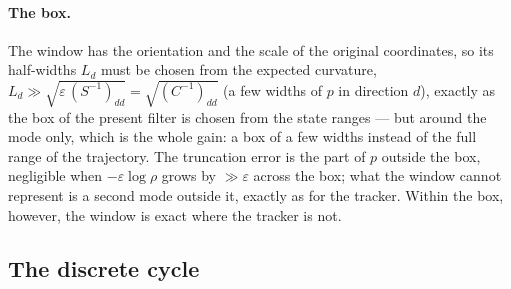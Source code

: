 \documentclass[11pt,a4paper]{article}
\newcommand{\eps}{\varepsilon}
\theoremstyle{plain}
\theoremstyle{definition}
\theoremstyle{remark}
\begin{document}
\paragraph{The box.}
The window has the orientation and the scale of the original coordinates, so its half-widths $L_d$ must be chosen from the expected curvature, $L_d\gg\sqrt{\eps\,(S^{-1})_{dd}} = \sqrt{(C^{-1})_{dd}}$ (a few widths of $p$ in direction $d$), exactly as the box of the present filter is chosen from the state ranges --- but around the mode only, which is the whole gain: a box of a few widths instead of the full range of the trajectory. The truncation error is the part of $p$ outside the box, negligible when $-\eps\log\rho$ grows by $\gg\eps$ across the box; what the window cannot represent is a second mode outside it, exactly as for the tracker. Within the box, however, the window is exact where the tracker is not.

\subsection{The discrete cycle}
\label{sec:tr_cycle}
\end{document}
